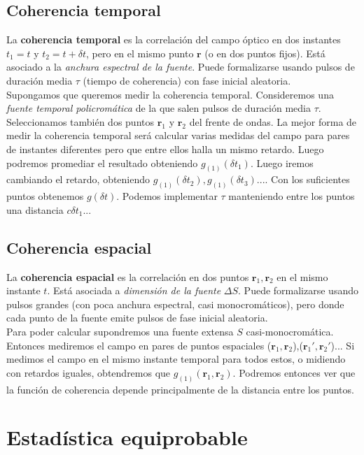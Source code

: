 \documentclass[12pt,a4paper]{book}
\numberwithin{equation}{section}
\numberwithin{figure}{section}
\newcommand{\1}{_{(1)}}
\newcommand{\2}{_{(2)}}
\newcommand{\rn}{\mathbf{r}}
\theoremstyle{definition}
\begin{document}
\subsection{Coherencia temporal}

La \textbf{coherencia temporal} es la correlación del campo óptico en dos instantes $t_1=t$ y $t_2=t+\delta t$, pero en el mismo punto $\rn$ (o en dos puntos fijos). Está asociado a la \textit{anchura espectral de la fuente}. Puede formalizarse usando pulsos de duración media $\tau$ (tiempo de coherencia) con fase inicial aleatoria. \\

Supongamos que queremos medir la coherencia temporal. Consideremos una \textit{fuente temporal policromática} de la que salen pulsos de duración media $\tau$. Seleccionamos también dos puntos $\rn_1$ y $\rn_2$ del frente de ondas. La mejor forma de medir la coherencia temporal será calcular varias medidas del campo para pares de instantes diferentes pero que entre ellos halla un mismo retardo. Luego podremos promediar el resultado obteniendo $g_{(1)}(\delta t_1)$. Luego iremos cambiando el retardo, obteniendo $g_{(1)}(\delta t_2),g_{(1)}(\delta t_3)...$. Con los suficientes puntos obtenemos $g(\delta t)$. Podemos implementar $\tau$ manteniendo entre los puntos una distancia $c \delta t_1...$

\subsection{Coherencia espacial}

La \textbf{coherencia espacial} es la correlación en dos puntos $\rn_1,\rn_2$ en el mismo instante $t$. Está asociada a \textit{dimensión de la fuente} $\Delta S$. Puede formalizarse usando pulsos grandes (con poca anchura espectral, casi monocromáticos), pero donde cada punto de la fuente emite pulsos de fase inicial aleatoria.  \\

Para poder calcular supondremos una fuente extensa $S$ casi-monocromática. Entonces mediremos el campo en pares de puntos espaciales ($\rn_1,\rn_2$),($\rn_1',\rn_2'$)... Si medimos el campo en el mismo instante temporal para todos estos, o midiendo con retardos iguales, obtendremos que $g\1 (\rn_1,\rn_2)$. Podremos entonces ver que la función de coherencia depende principalmente de la distancia entre los puntos. 

\section{Estadística equiprobable}
\end{document}
